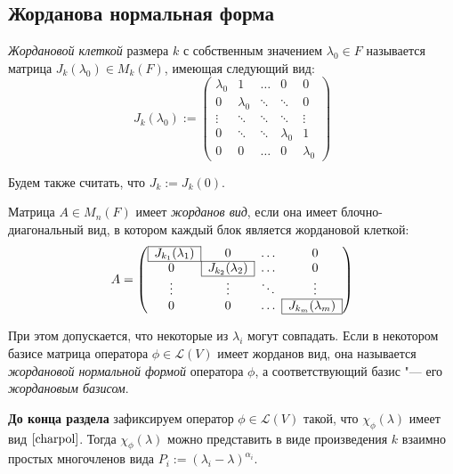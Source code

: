 \subsection{Жорданова нормальная форма}

\begin{definition}
	\textit{Жордановой клеткой} размера $k$ с собственным значением $\lambda_0 \in F$ называется матрица $J_k(\lambda_0) \in M_k(F)$, имеющая следующий вид:
	\[J_k(\lambda_0) := \begin{pmatrix}
		\lambda_0 & 1 & \dots & 0 & 0 \\ 
		0 & \lambda_0 & \ddots & \ddots & 0 \\ 
		\vdots & \ddots & \ddots & \ddots & \vdots \\ 
		0 & \ddots & \ddots & \lambda_0 & 1 \\ 
		0 & 0 & \dots & 0 & \lambda_0
	\end{pmatrix}\]
	
	Будем также считать, что $J_k := J_k(0)$.
\end{definition}

\begin{definition}
	Матрица $A \in M_n(F)$ имеет \textit{жорданов вид}, если она имеет блочно-диагональный вид, в котором каждый блок является жордановой клеткой:
	\[A = \left(\begin{array}{@{}cccc@{}}
		\cline{1-1}
		\multicolumn{1}{|c|}{J_{k_1}(\lambda_1)} & 0 & \dots & 0\\
		\cline{1-2}
		0 & \multicolumn{1}{|c|}{J_{k_2}(\lambda_2)} & \dots & 0\\
		\cline{2-2}
		\vdots & \vdots & \ddots & \vdots\\
		\cline{4-4}
		0 & 0 & \dots & \multicolumn{1}{|c|}{J_{k_m}(\lambda_m)}\\
		\cline{4-4}
	\end{array}\right)\]
	
	При этом допускается, что некоторые из $\lambda_i$ могут совпадать. Если в некотором базисе матрица оператора $\phi \in \mathcal{L}(V)$ имеет жорданов вид, она называется \textit{жордановой нормальной формой} оператора $\phi$, а соответствующий базис "--- его \textit{жордановым базисом}.
\end{definition}

\textbf{До конца раздела} зафиксируем оператор $\phi \in \mathcal L(V)$ такой, что  $\chi_\phi(\lambda)$ имеет вид $\eqref*{charpol}$. Тогда $\chi_\phi(\lambda)$ можно представить в виде произведения $k$ взаимно простых многочленов вида $P_i := (\lambda_i - \lambda)^{\alpha_i}$.

